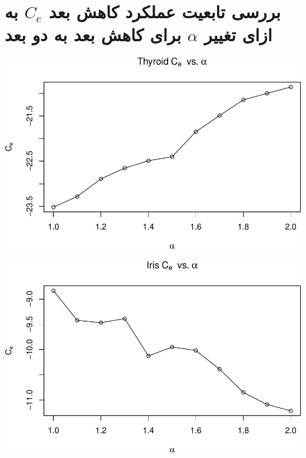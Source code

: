 \section{
بررسی تابعیت عملکرد کاهش بعد $C_e$ به ازای تغییر $\alpha$ برای کاهش بعد به دو بعد
}


\begin{center}\includegraphics[width=1\linewidth]{Report_files/figure-latex/unnamed-chunk-20-1} \end{center}

\begin{center}\includegraphics[width=1\linewidth]{Report_files/figure-latex/unnamed-chunk-20-2} \end{center}

